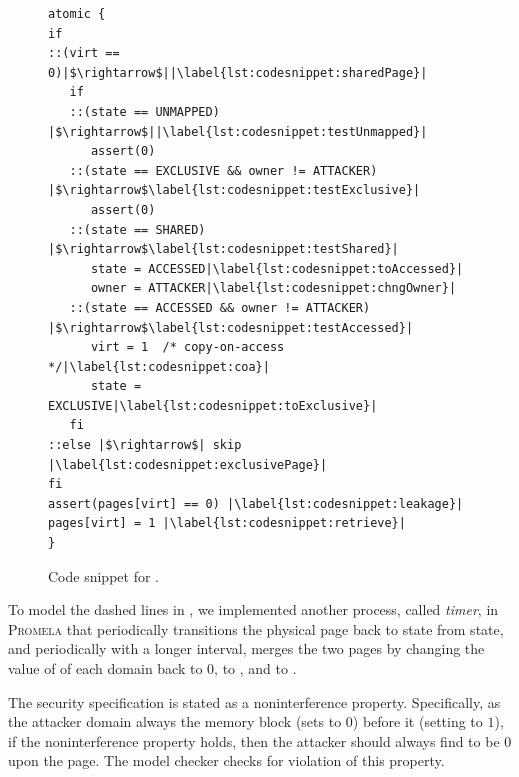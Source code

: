 \begin{figure}[h]
\vspace{-0.1in}
\centering
\begin{minipage}{0.7\linewidth}
\begin{lstlisting}
atomic {
if
::(virt == 0)|$\rightarrow$||\label{lst:codesnippet:sharedPage}|
   if
   ::(state == UNMAPPED) |$\rightarrow$||\label{lst:codesnippet:testUnmapped}|
      assert(0)
   ::(state == EXCLUSIVE && owner != ATTACKER) |$\rightarrow$\label{lst:codesnippet:testExclusive}|
      assert(0)
   ::(state == SHARED) |$\rightarrow$\label{lst:codesnippet:testShared}|
      state = ACCESSED|\label{lst:codesnippet:toAccessed}|
      owner = ATTACKER|\label{lst:codesnippet:chngOwner}|
   ::(state == ACCESSED && owner != ATTACKER) |$\rightarrow$\label{lst:codesnippet:testAccessed}|
      virt = 1  /* copy-on-access */|\label{lst:codesnippet:coa}|
      state = EXCLUSIVE|\label{lst:codesnippet:toExclusive}|
   fi
::else |$\rightarrow$| skip |\label{lst:codesnippet:exclusivePage}|
fi
assert(pages[virt] == 0) |\label{lst:codesnippet:leakage}|
pages[virt] = 1 |\label{lst:codesnippet:retrieve}|
}
\end{lstlisting}
\end{minipage}
\vspace{-0.1in}
\caption{Code snippet for \Reload.}
\label{fig:codesnippet}
\end{figure}

To model the dashed lines in , we implemented
another process, called \textit{timer}, in \textsc{Promela} that
periodically transitions the physical page back to \shared state from
\accessed state, and periodically with a longer interval, merges the
two pages by changing the value of \mcVirt of each domain back to $0$,
\mcOwner to \mcNoOwner, and \mcState to \shared.

The security specification is stated as a noninterference property.
Specifically, as the attacker domain always  the memory
block (sets \mcPages{\mcVirt} to $0$) before  it (setting
\mcPages{\mcVirt} to $1$), if the noninterference property holds,
then the attacker should always find \mcPages{\mcVirt} to be $0$ upon
 the page.  The model checker checks for violation of this
property.

